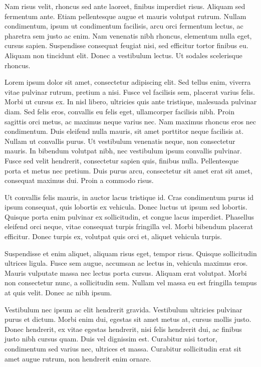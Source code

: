 Nam risus velit, rhoncus sed ante laoreet, finibus imperdiet risus. Aliquam sed fermentum ante. Etiam pellentesque augue et mauris volutpat rutrum. Nullam condimentum, ipsum ut condimentum facilisis, arcu orci fermentum lectus, ac pharetra sem justo ac enim. Nam venenatis nibh rhoncus, elementum nulla eget, cursus sapien. Suspendisse consequat feugiat nisi, sed efficitur tortor finibus eu. Aliquam non tincidunt elit. Donec a vestibulum lectus. Ut sodales scelerisque rhoncus. 



Lorem ipsum dolor sit amet, consectetur adipiscing elit. Sed tellus enim, viverra vitae pulvinar rutrum, pretium a nisi. Fusce vel facilisis sem, placerat varius felis. Morbi ut cursus ex. In nisl libero, ultricies quis ante tristique, malesuada pulvinar diam. Sed felis eros, convallis eu felis eget, ullamcorper facilisis nibh. Proin sagittis orci metus, ac maximus neque varius nec. Nam maximus rhoncus eros nec condimentum. Duis eleifend nulla mauris, sit amet porttitor neque facilisis at. Nullam ut convallis purus. Ut vestibulum venenatis neque, non consectetur mauris. In bibendum volutpat nibh, nec vestibulum ipsum convallis pulvinar. Fusce sed velit hendrerit, consectetur sapien quis, finibus nulla. Pellentesque porta et metus nec pretium. Duis purus arcu, consectetur sit amet erat sit amet, consequat maximus dui. Proin a commodo risus.

Ut convallis felis mauris, in auctor lacus tristique id. Cras condimentum purus id ipsum consequat, quis lobortis ex vehicula. Donec luctus ut ipsum sed lobortis. Quisque porta enim pulvinar ex sollicitudin, et congue lacus imperdiet. Phasellus eleifend orci neque, vitae consequat turpis fringilla vel. Morbi bibendum placerat efficitur. Donec turpis ex, volutpat quis orci et, aliquet vehicula turpis.

Suspendisse et enim aliquet, aliquam risus eget, tempor risus. Quisque sollicitudin ultrices ligula. Fusce sem augue, accumsan ac lectus in, vehicula maximus eros. Mauris vulputate massa nec lectus porta cursus. Aliquam erat volutpat. Morbi non consectetur nunc, a sollicitudin sem. Nullam vel massa eu est fringilla tempus at quis velit. Donec ac nibh ipsum.

Vestibulum nec ipsum ac elit hendrerit gravida. Vestibulum ultricies pulvinar purus et dictum. Morbi enim dui, egestas sit amet metus at, cursus mollis justo. Donec hendrerit, ex vitae egestas hendrerit, nisi felis hendrerit dui, ac finibus justo nibh cursus quam. Duis vel dignissim est. Curabitur nisi tortor, condimentum sed varius nec, ultrices et massa. Curabitur sollicitudin erat sit amet augue rutrum, non hendrerit enim ornare.

